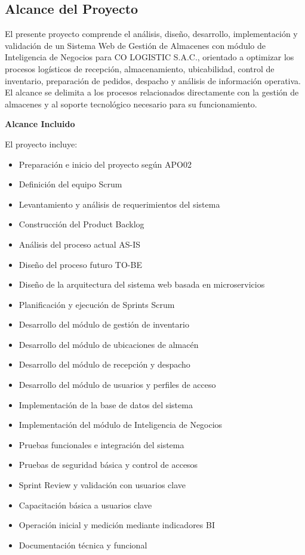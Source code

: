 \documentclass[11pt, a4paper, oneside]{report}
\begin{document}
\subsection{Alcance del Proyecto}

El presente proyecto comprende el análisis, diseño, desarrollo, implementación y validación de un Sistema Web de Gestión de Almacenes con módulo de Inteligencia de Negocios para CO LOGISTIC S.A.C., orientado a optimizar los procesos logísticos de recepción, almacenamiento, ubicabilidad, control de inventario, preparación de pedidos, despacho y análisis de información operativa. El alcance se delimita a los procesos relacionados directamente con la gestión de almacenes y al soporte tecnológico necesario para su funcionamiento.

\textbf{Alcance Incluido}

El proyecto incluye:

\begin{itemize}
    \item Preparación e inicio del proyecto según APO02
    \item Definición del equipo Scrum
    \item Levantamiento y análisis de requerimientos del sistema
    \item Construcción del Product Backlog
    \item Análisis del proceso actual AS-IS
    \item Diseño del proceso futuro TO-BE
    \item Diseño de la arquitectura del sistema web basada en microservicios
    \item Planificación y ejecución de Sprints Scrum
    \item Desarrollo del módulo de gestión de inventario
    \item Desarrollo del módulo de ubicaciones de almacén
    \item Desarrollo del módulo de recepción y despacho
    \item Desarrollo del módulo de usuarios y perfiles de acceso
    \item Implementación de la base de datos del sistema
    \item Implementación del módulo de Inteligencia de Negocios
    \item Pruebas funcionales e integración del sistema
    \item Pruebas de seguridad básica y control de accesos
    \item Sprint Review y validación con usuarios clave
    \item Capacitación básica a usuarios clave
    \item Operación inicial y medición mediante indicadores BI
    \item Documentación técnica y funcional
\end{itemize}
\end{document}
